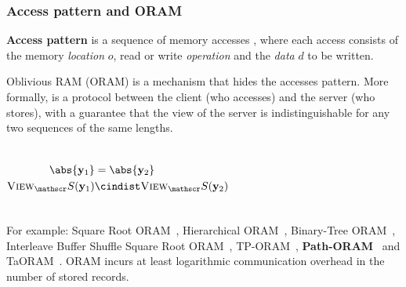	\begin{frame}[label={frame:appendix:oram}]

		\frametitle{Access pattern and ORAM}

		\justifying%

		\textbf{Access pattern} is a sequence of memory accesses \oramProgram{}, where each access consists of the memory \emph{location} $o$, read \oramRead{} or write \oramWrite{} \emph{operation} and the \emph{data} $d$ to be written.

		Oblivious RAM (ORAM) is a mechanism that hides the accesses pattern.
		More formally, \oram{} is a protocol between the client \client{} (who accesses) and the server \server{} (who stores), with a guarantee that the view of the server is indistinguishable for any two sequences of the same lengths.

		\begin{columns}[T]

				\[
					\begin{split}
						\abs{\oramProgram_1}					& = \abs{\oramProgram_2}							\\
						\textsc{View}_\server (\oramProgram_1)	& \cindist \textsc{View}_\server (\oramProgram_2)
					\end{split}
				\]



		\end{columns}

		\vspace*{1ex}

		For example: Square Root ORAM~\cite{oram-theory}, Hierarchical ORAM~\cite{oram-original}, Binary-Tree ORAM~\cite{binary-tree-oram}, Interleave Buffer Shuffle Square Root ORAM~\cite{shortest-path-oram}, TP-ORAM~\cite{tp-oram}, \textbf{Path-ORAM}~\cite{path-oram} and TaORAM~\cite{taostore}.
		\alert{ORAM incurs at least logarithmic communication overhead in the number of stored records.~\cite{oram-original}}

		\begin{flushright}
			\hyperlink{frame:epsolute-motivation}{}
		\end{flushright}

	\end{frame}
